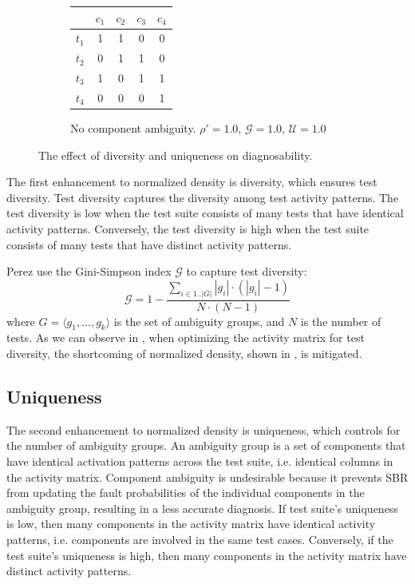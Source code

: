 \documentclass[twoside,a4paper,11pt]{memoir}
\begin{document}
\begin{figure}
\begin{subfigure}[b]{0.49\linewidth}
        \label{subfig:ambiguity}
    \end{subfigure}
    \hfill
    \begin{subfigure}[b]{0.49\linewidth}
        \centering
        \begin{tabular}{c|cccc}
          & $c_1$ & $c_2$ & $c_3$ & $c_4$     \\ \hline
          $t_1$ & 1 & 1 & 0 & 0 \\
          $t_2$ & 0 & 1 & 1 & 0 \\
          $t_3$ & 1 & 0 & 1 & 1 \\
          $t_4$ & 0 & 0 & 0 & 1 \\
        \end{tabular}
        \caption{No component ambiguity. $\rho' = 1.0$, $\mathcal{G}=1.0$, $\mathcal{U}=1.0$}
        \label{subfig:no_ambiguity}
    \end{subfigure}
    \caption{The effect of diversity and uniqueness on diagnosability.}
    \label{fig:diversity_ambiguity}
\end{figure}

The first enhancement to normalized density is diversity, which ensures test diversity.
Test diversity captures the diversity among test activity patterns.
The test diversity is low when the test suite consists of many tests that have identical activity patterns.
Conversely, the test diversity is high when the test suite consists of many tests that have distinct activity patterns.

Perez \etal use the Gini-Simpson index $\mathcal{G}$ \cite{OIK:OIK14714} to capture test diversity:
\begin{equation}
  \mathcal{G} = 1 - \frac{\sum_{i \in 1..|G|} |g_i| \cdot (|g_i| - 1)}{N \cdot (N - 1)}
\end{equation}
where $G = \langle g_1, \dots, g_k \rangle$ is the set of ambiguity groups, and $N$ is the number of tests.
As we can observe in , when optimizing the activity matrix for test diversity, the shortcoming of normalized density, shown in , is mitigated.

\subsection{Uniqueness}
The second enhancement to normalized density is uniqueness, which controls for the number of ambiguity groups.
An ambiguity group is a set of components that have identical activation patterns across the test suite, i.e. identical columns in the activity matrix.
Component ambiguity is undesirable because it prevents SBR from updating the fault probabilities of the individual components in the ambiguity group, resulting in a less accurate diagnosis.
If test suite's uniqueness is low, then many components in the activity matrix have identical activity patterns, i.e. components are involved in the same test cases.
Conversely, if the test suite's uniqueness is high, then many components in the activity matrix have distinct activity patterns.
\end{document}

